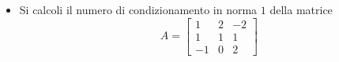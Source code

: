 \begin{itemize}
\item Si calcoli il numero di condizionamento in norma $1$ della matrice
\bigskip
\[
A=\left[
\begin{array}{ccc}
1 & 2 & -2 \\
1 & 1 & 1\\
-1 & 0 & 2
\end{array}\right]
\]
\end{itemize}
